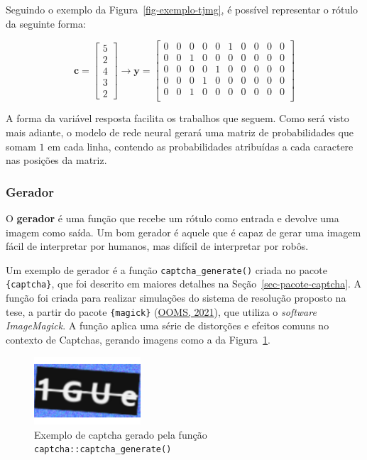 \documentclass[12pt,twoside,brazilian]{book}
\begin{document}
Seguindo o exemplo da Figura~\ref{fig-exemplo-tjmg}, é possível
representar o rótulo da seguinte forma:

\[
\mathbf c = \left[\begin{array}{c}
     5  \\
     2 \\
     4 \\
     3 \\
     2
\end{array}\right] \rightarrow \mathbf{y} = \left[\begin{array}{cccccccccc}
    0 & 0 & 0 & 0 & 0 & 1 & 0 & 0 & 0 & 0 \\
    0 & 0 & 1 & 0 & 0 & 0 & 0 & 0 & 0 & 0 \\
    0 & 0 & 0 & 0 & 1 & 0 & 0 & 0 & 0 & 0 \\
    0 & 0 & 0 & 1 & 0 & 0 & 0 & 0 & 0 & 0 \\
    0 & 0 & 1 & 0 & 0 & 0 & 0 & 0 & 0 & 0 \\
\end{array}\right]
\]

A forma da variável resposta facilita os trabalhos que seguem. Como será
visto mais adiante, o modelo de rede neural gerará uma matriz de
probabilidades que somam \(1\) em cada linha, contendo as probabilidades
atribuídas a cada caractere nas posições da matriz.

\hypertarget{gerador}{%
\subsubsection{Gerador}\label{gerador}}

O \textbf{gerador} é uma função que recebe um rótulo como entrada e
devolve uma imagem como saída. Um bom gerador é aquele que é capaz de
gerar uma imagem fácil de interpretar por humanos, mas difícil de
interpretar por robôs.

Um exemplo de gerador é a função \texttt{captcha\_generate()} criada no
pacote \texttt{\{captcha\}}, que foi descrito em maiores detalhes na
Seção~\ref{sec-pacote-captcha}. A função foi criada para realizar
simulações do sistema de resolução proposto na tese, a partir do pacote
\texttt{\{magick\}} (\protect\hyperlink{ref-magick}{OOMS, 2021}), que
utiliza o \emph{software} \emph{ImageMagick}. A função aplica uma série
de distorções e efeitos comuns no contexto de Captchas, gerando imagens
como a da Figura~\ref{fig-captcha-r-exemplo}.

\begin{figure}

{\centering \includegraphics[width=1.5625in,height=\textheight]{./metodologia_files/figure-pdf/fig-captcha-r-exemplo-1.pdf}

}

\caption{\label{fig-captcha-r-exemplo}Exemplo de captcha gerado pela
função \texttt{captcha::captcha\_generate()}}

\end{figure}
\end{document}
